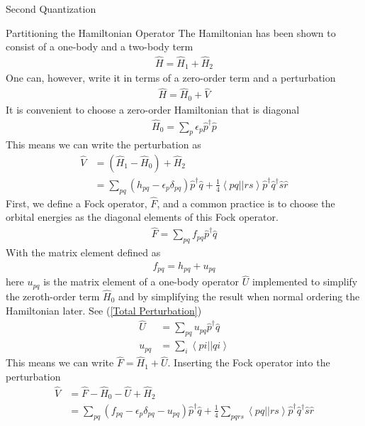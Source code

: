\documentclass[twoside,english]{uiofysmaster}
\begin{document}
\begin{chapter}{Second Quantization}
	\begin{section}{Partitioning the Hamiltonian Operator}
		The Hamiltonian has been shown to consist of a one-body and a two-body term
		\begin{align}
			\hat H = \hat H_1 + \hat H_2
		\end{align}
		One can, however, write it in terms of a zero-order term and a perturbation
		\begin{align}
			\hat H = \hat H_0 + \hat V
		\end{align}
		It is convenient to choose a zero-order Hamiltonian that is diagonal
		\begin{align}
			\hat H_0 = \sum_p \epsilon_p \hat p^\dagger \hat p
		\end{align}
		This means we can write the perturbation as
		\begin{align}
			\hat V &= (\hat H_1 - \hat H_0) + \hat H_2 \\
			&= \sum_{pq}(h_{pq} - \epsilon_p \delta_{pq} ) \hat p^\dagger \hat q + \frac{1}{4}\left<pq||rs\right>\hat p^\dagger \hat q^\dagger \hat s \hat r 
		\end{align}
		First, we define a Fock operator, $\hat F$, and a common practice is to choose the orbital energies as the diagonal elements of this Fock operator. 
		\begin{align}
			\hat F = \sum_{pq} f_{pq} \hat p^\dagger \hat q
		\end{align}
		With the matrix element defined as
		\begin{align}
			f_{pq} = h_{pq} + u_{pq}
		\end{align}
		here $u_{pq}$ is the matrix element of a one-body operator $\hat U$ implemented to simplify the zeroth-order term $\hat H_0$ and by simplifying the result when normal ordering the Hamiltonian later. See (\ref{Total Perturbation})
		\begin{align}
			\hat U &= \sum_{pq} u_{pq} \hat p^\dagger \hat q \\
			u_{pq} &= \sum_i \left<pi||qi\right>
		\end{align}
		This means we can write $\hat F = \hat H_1 + \hat U$. Inserting the Fock operator into the perturbation
		\begin{align}
			\hat V &= \hat F - \hat H_0 - \hat U + \hat H_2 \\
				   &= \sum_{pq}(f_{pq} - \epsilon_p \delta_{pq} - u_{pq}) \hat p^\dagger \hat q + \frac{1}{4} \sum_{pqrs} \left<pq||rs\right> \hat p^\dagger \hat q^\dagger \hat s \hat r
			\label{3.93}	
		\end{align}

\end{section}
\end{chapter}
\end{document}
